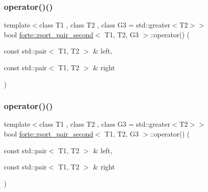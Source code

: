 \mbox{\label{structforte_1_1rsort__pair__second_a041ae6341761974fbda05cb907597fd7}} 
\subsubsection{\texorpdfstring{operator()()}{operator()()}\hspace{0.1cm}{\footnotesize\ttfamily [2/3]}}
{\footnotesize\ttfamily template$<$class T1 , class T2 , class G3  = std\+::greater$<$\+T2$>$$>$ \\
bool \mbox{\hyperlink{structforte_1_1rsort__pair__second}{forte\+::rsort\+\_\+pair\+\_\+second}}$<$ T1, T2, G3 $>$\+::operator() (\begin{DoxyParamCaption}\item[{const std\+::pair$<$ T1, T2 $>$ \&}]{left,  }\item[{const std\+::pair$<$ T1, T2 $>$ \&}]{right }\end{DoxyParamCaption})\hspace{0.3cm}{\ttfamily [inline]}}

\mbox{\label{structforte_1_1rsort__pair__second_a041ae6341761974fbda05cb907597fd7}} 
\subsubsection{\texorpdfstring{operator()()}{operator()()}\hspace{0.1cm}{\footnotesize\ttfamily [3/3]}}
{\footnotesize\ttfamily template$<$class T1 , class T2 , class G3  = std\+::greater$<$\+T2$>$$>$ \\
bool \mbox{\hyperlink{structforte_1_1rsort__pair__second}{forte\+::rsort\+\_\+pair\+\_\+second}}$<$ T1, T2, G3 $>$\+::operator() (\begin{DoxyParamCaption}\item[{const std\+::pair$<$ T1, T2 $>$ \&}]{left,  }\item[{const std\+::pair$<$ T1, T2 $>$ \&}]{right }\end{DoxyParamCaption})\hspace{0.3cm}{\ttfamily [inline]}}



